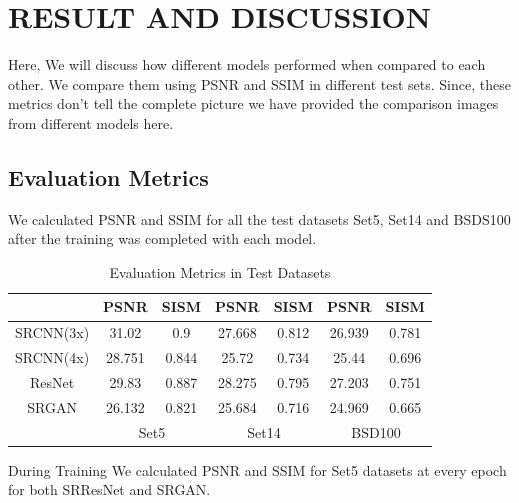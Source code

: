 \newpage
\section{RESULT AND DISCUSSION}
Here, We will discuss how different models performed when compared to each other. We compare them using PSNR and SSIM in different test sets. Since, these metrics don't tell the complete picture we have provided the comparison images from different models here.
\subsection{Evaluation Metrics}
We calculated PSNR and SSIM for all the test datasets Set5, Set14 and BSDS100 after the training was completed with each model.
\begin{table}[h]
    \centering
    \begin{tabular}{|c|c|c|c|c|c|c|}
    \hline
    &PSNR & SISM & PSNR & SISM & PSNR & SISM \\
    \hline
    SRCNN(3x)&31.02 & 0.9 & 27.668 & 0.812 & 26.939 & 0.781 \\
    \hline
    SRCNN(4x)&28.751 & 0.844 & 25.72 & 0.734 & 25.44 & 0.696 \\
    \hline
    ResNet&29.83 & 0.887 & 28.275 & 0.795 & 27.203 & 0.751 \\
    \hline
    SRGAN &26.132 & 0.821 &25.684 & 0.716 & 24.969 & 0.665 \\
    \hline
    & \multicolumn{2}{|c|}{Set5}& \multicolumn{2}{|c|}{Set14} & \multicolumn{2}{|c|}{BSD100} \\
    \hline
    \end{tabular}
    \caption{Evaluation Metrics in Test Datasets}
\end{table}
\clearpage
During Training We calculated PSNR and SSIM for Set5 datasets at every epoch for both SRResNet and SRGAN.

